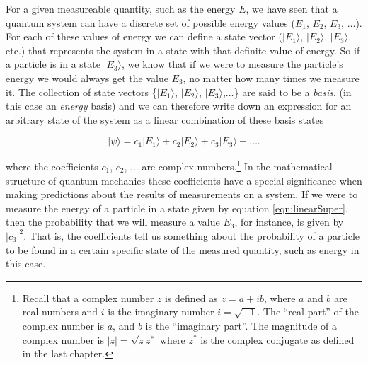 For a given measureable quantity, such as the energy $E$, we have seen that a quantum system can have a discrete set of possible energy values ($E_1$, $E_2$, $E_3$, $\ldots$).  For each of these values of energy we can define a state vector ($|\mbox{$E_1$}\rangle$, $|\mbox{$E_2$}\rangle$, $|\mbox{$E_3$}\rangle$, etc.) that represents the system in a state with that definite value of energy.  So if a particle is in a state $|\mbox{$E_3$}\rangle$, we know that if we were to measure the particle's energy we would always get the value $E_3$, no matter how many times we measure it.  The collection of state vectors \{$|\mbox{$E_1$}\rangle$, $|\mbox{$E_2$}\rangle$, $|\mbox{$E_3$}\rangle$,$\ldots$\} are said to be a {\em basis}, (in this case an {\em energy} basis) and we can therefore write down an expression for an arbitrary state of the system as a linear combination of these basis states

\begin{equation}
|\mbox{$\psi$}\rangle = c_1 |\mbox{$E_1$}\rangle + c_2 |\mbox{$E_2$}\rangle + c_3 |\mbox{$E_3$}\rangle + \ldots .
\label{eqn:linearSuper}
\end{equation}

\noindent where the coefficients $c_1$, $c_2$, $\ldots$ are complex numbers.\footnote{Recall that a complex number $z$ is defined as $z = a + ib$, where $a$ and $b$ are
real numbers and $i$ is the
imaginary number $i=\sqrt{-1}$. The ``real part'' of the
complex number is $a$, and $b$ is the ``imaginary part''. The magnitude of a complex number is $|z| = \sqrt{z\ z^*}$ where $z^*$ is the complex conjugate as defined in the last chapter.}  In the mathematical structure of quantum mechanics these coefficients have a special significance when making predictions about the results of measurements on a system.  If we were to measure the energy of a particle in a state given by equation \ref{eqn:linearSuper}, then the probability that we will measure a value $E_3$, for instance, is given by $|c_3|^2$.  That is, the coefficients tell us something about the probability of a particle to be found in a certain specific state of the measured quantity, such as energy in this case.

